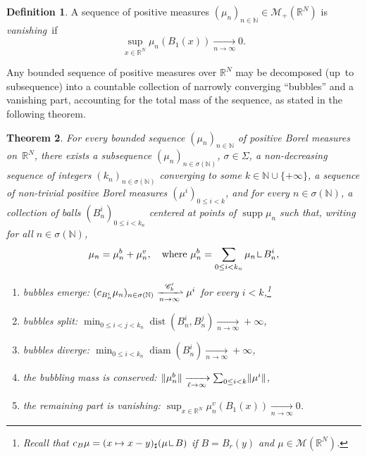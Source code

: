 \documentclass[11pt]{article}
\newlength{\normalparindent}
\theoremstyle{plain}
\newtheorem{theorem}{Theorem}[section]
\theoremstyle{definition}
\newtheorem{definition}[theorem]{Definition}
\newcommand{\N}{\mathbb{N}}
\newcommand{\R}{\mathbb{R}}
\newcommand{\Cspace}{\mathscr{C}}
\newcommand{\Mspace}{\mathscr{M}}
\newcommand{\mres}{\mathop{\hbox{\vrule height 6pt width .5pt depth 0pt \vrule height .5pt width 4pt depth 0pt}}\nolimits}
\DeclarePairedDelimiter{\norm}{\lVert}{\rVert}
\DeclareMathOperator{\supp}{supp}
\DeclareMathOperator{\diam}{diam}
\DeclareMathOperator{\dist}{dist}
\newcommand{\xto}[2][]{\xrightarrow[#2]{#1}}
\newcommand{\xnarrowto}[1]{\xrightharpoonup[#1]{\Cspace_b'}}
\numberwithin{equation}{section}
\begin{document}
\begin{definition}\label{DefinitionVanishing}
A sequence of positive measures $(\mu_n)_{n\in\N} \!\in\! \Mspace_+(\R^N)$ is \emph{vanishing}~if
\[\sup_{x\in \R^N} \mu_n(B_1(x)) \xto{n\to \infty} 0.\]
\end{definition}

Any bounded sequence of positive measures over $\R^N$ may be decomposed (up~to subsequence) into a countable collection of narrowly converging \enquote{bubbles} and a vanishing part, accounting for the total mass of the sequence, as stated in the following theorem.

\begin{theorem}\label{profileDecomposition}
For every bounded sequence \((\mu_n)_{n\in\N}\) of positive Borel measures on~\(\R^N\), there exists a subsequence \((\mu_n)_{n \in \sigma(\N)}\), $\sigma \in \Sigma$, a non-decreasing sequence of integers $(k_n)_{n \in \sigma(\N)}$ converging to some $k \in \N \cup \{+\infty\}$, a sequence of non-trivial positive Borel measures $(\mu^i)_{0\le i<k}$, and for every $n \in \sigma(\N)$, a collection of balls $(B^i_n)_{0 \leq i < k_n}$ centered at points of $\supp \mu_n$ such that, writing for all $n\in \sigma(\N)$,
\begin{equation}
\mu_n = \mu^b_n + \mu^v_n,\quad \text{where } \mu^b_n = \sum_{0\le i < k_n} \mu_n \mres B_n^i,
\end{equation}
\vspace*{-5pt}
\begin{enumerate}[\textnormal(\textup{\Alph*}\textnormal),leftmargin=1.3\normalparindent]
\item\label{bubbleEmergence} bubbles emerge: $(c_{B_{n}^i} \mu_{n})_{n\in\sigma(\N)}\xnarrowto{n\to\infty}\mu^i$ for every $i<k$,\footnote{Recall that $c_B \mu = (x\mapsto x-y)_\sharp(\mu \mres B)$ if $B = B_r(y)$ and $\mu \in \Mspace(\R^N)$.}
\item\label{bubbleSplitting} bubbles split: $\min_{0\le i<j< k_{n}}\dist(B_{n}^i,B_{n}^j) \xto{n\to\infty} +\infty$,
\item\label{bubbleDivergence} bubbles diverge: $ \min_{0\le i< k_n}\diam(B_{n}^i) \xto{n\to\infty} +\infty$,
\item\label{bubblingMassConservation} the bubbling mass is conserved: $\norm{\mu^b_{n}} \xto{\ell \to \infty} \sum_{0\le i<k} \norm{\mu^i}$,
\item\label{remainingVanishing} the remaining part is vanishing: $\sup_{x\in \R^N} \mu^v_{n}(B_1(x)) \xto{n\to\infty} 0$.
\end{enumerate}
\end{theorem}
\end{document}
